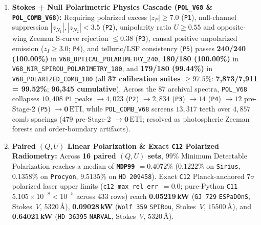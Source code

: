 \documentclass[twocolumn,10pt]{article}
\begin{document}
\begin{enumerate}\setlength{\itemsep}{2pt}\setlength{\parskip}{0pt}
  \item \textbf{Stokes + Null Polarimetric Physics Cascade (\texttt{POL\_V68} \& \texttt{POL\_COMB\_V68}):} Requiring polarized excess $|z_P|\ge 7.0$ (\texttt{P1}), null-channel suppression $|z_{N_1}|,|z_{N_2}| < 3.5$ (\texttt{P2}), unipolarity ratio $U \ge 0.55$ and opposite-wing Zeeman S-curve rejection $\le 0.38$ (\texttt{P3}), causal positive unpolarized emission ($z_I \ge 3.0$; \texttt{P4}), and telluric/LSF consistency (\texttt{P5}) passes \textbf{240/240 (100.00\%)} in \texttt{V68\_OPTICAL\_POLARIMETRY\_240}, \textbf{180/180 (100.00\%)} in \texttt{V68\_NIR\_SPIROU\_POLARIMETRY\_180}, and \textbf{179/180 (99.44\%)} in \texttt{V68\_POLARIZED\_COMB\_180} (all \textbf{37 calibration suites $\ge 97.5\%$}: \textbf{7,873/7,911 = 99.52\%}; \textbf{96,345 cumulative}). Across the 87 archival spectra, \texttt{POL\_V68} collapses $10{,}408$ \texttt{P1} peaks $\rightarrow 4{,}023$ (\texttt{P2}) $\rightarrow 2{,}834$ (\texttt{P3}) $\rightarrow 14$ (\texttt{P4}) $\rightarrow 12$ pre-Stage-2 (\texttt{P5}) $\rightarrow \mathbf{0\,\mathrm{ETI}}$, while \texttt{POL\_COMB\_V68} screens $13{,}317$ teeth over $4{,}857$ comb spacings ($479$ pre-Stage-2 $\rightarrow \mathbf{0\,\mathrm{ETI}}$; resolved as photospheric Zeeman forests and order-boundary artifacts).
  \item \textbf{Paired $(Q, U)$ Linear Polarization \& Exact \texttt{C12} Polarized Radiometry:} Across \textbf{16 paired $(Q, U)$ sets}, $99\%$ Minimum Detectable Polarization reaches a median of \textbf{\texttt{MDP99} $= 0.4072\%$} ($0.1222\%$ on \texttt{Sirius}, $0.1358\%$ on \texttt{Procyon}, $9.5135\%$ on \texttt{HD\,209458}). Exact \texttt{C12} Planck-anchored $7\sigma$ polarized laser upper limits (\texttt{c12\_max\_rel\_err $= 0.0$}; pure-Python \texttt{C11} $5.105\times 10^{-8} < 10^{-5}$ across $433$ rows) reach \textbf{0.05219\,kW} (\texttt{GJ\,729} \texttt{ESPaDOnS}, Stokes~$V$, $5320\,\text{\AA}$), \textbf{0.09028\,kW} (\texttt{Wolf\,359} \texttt{SPIRou}, Stokes~$V$, $15500\,\text{\AA}$), and \textbf{0.64021\,kW} (\texttt{HD\,36395} \texttt{NARVAL}, Stokes~$V$, $5320\,\text{\AA}$).

\end{enumerate}
\end{document}
